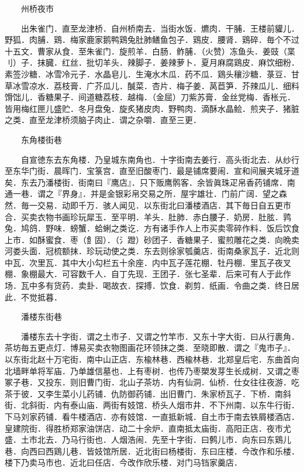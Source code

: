 　　州桥夜市

　　出朱雀门．直至龙津桥．自州桥南去．当街水饭．爊肉．干脯．王楼前貛儿．野狐．肉脯．鶏．梅家鹿家鹅鸭鶏兔肚肺鳝鱼包子．鶏皮．腰肾．鶏碎．毎个不过十五文．曹家从食．至朱雀门．旋煎羊．白肠．鲊脯．（火赞）冻鱼头．姜豉（枼刂）子．抹臓．红丝．批切羊头．辣脚子．姜辣萝卜．夏月麻腐鶏皮．麻饮细粉．素签沙糖．冰雪冷元子．水晶皂儿．生淹水木瓜．药不瓜．鶏头穰沙糖．菉豆．甘草冰雪凉水．荔枝膏．广芥瓜儿．醎菜．杏片．梅子姜．莴苣笋．芥辣瓜儿．细料馉饳儿．香糖果子．间道糖荔枝．越梅．（金屈）刀紫苏膏．金丝党梅．香枨元．皆用梅红匣儿盛贮．冬月盘兔．旋炙猪皮肉．野鸭肉．滴酥水晶鲙．煎夹子．猪脏之类．直至龙津桥须脑子肉止．谓之杂嚼．直至三更．

　　东角楼街巷

　　自宣徳东去东角楼．乃皇城东南角也．十字街南去姜行．高头街北去．从纱行至东华门街．晨晖门．宝箓宫．直至旧酸枣门．最是铺席要闹．宣和间展夹城牙道矣．东去乃潘楼街．街南曰『鹰店』．只下贩鹰鹘客．余皆眞珠疋帛香药铺席．南通一巷．谓之『界身』．并是金银彩帛交易之所．屋宇雄壮．门前广阔．望之森然．毎一交易．动即千万．骇人闻见．以东街北曰潘楼酒店．其下毎日自五更市合．买卖衣物书画珍玩犀玉．至平明．羊头．肚肺．赤白腰子．奶房．肚胘．鹑兔．鸠鸽．野味．螃蟹．蛤蜊之类讫．方有诸手作人上市买卖零碎作料．饭后饮食上市．如酥蜜食．枣（飠固）．（氵蹬）砂团子．香糖果子．蜜煎雕花之类．向晩卖河娄头面．冠梳额抹．珍玩动使之类．东去则徐家瓠羹店．街南桑家瓦子．近北则中瓦．次里瓦．其中大小勾栏五十余座．内中瓦子莲花棚．牡丹棚．里瓦子夜叉棚．象棚最大．可容数千人．自丁先现．王团子．张七圣辈．后来可有人于此作场．瓦中多有货药．卖卦．喝故衣．探搏．饮食．剃剪．纸画．令曲之类．终日居此．不觉抵暮．

　　潘楼东街巷

　　潘楼东去十字街．谓之土市子．又谓之竹竿市．又东十字大街．曰从行裹角．茶坊毎五更点灯．博易买卖衣物图画花环领抹之类．至晓即散．谓之『鬼市子』．以东街北赵十万宅街．南中山正店．东楡林巷．西楡林巷．北郑皇后宅．东曲首向北墙畔单将军庙．乃单雄信墓也．上有枣树．也传乃枣槊发芽生长成树．又谓之枣冢子巷．又投东．则旧曹门街．北山子茶坊．内有仙洞．仙桥．仕女往往夜游．吃茶于彼．又李生菜小儿药铺．仇防御药铺．出旧曹门．朱家桥瓦子．下桥．南斜街．北斜街．内有泰山庙．两街有妓馆．桥头人烟市井．不下州南．以东牛行街．下马刘家药铺．看牛楼酒店．亦有妓馆．一直抵新城．自土市于南去铁屑楼酒店．皇建院街．得胜桥郑家油饼店．动二十余炉．直南抵太庙街．高阳正店．夜市尤盛．土市北去．乃马行街也．人烟浩闹．先至十字街．曰鹩儿市．向东曰东鶏儿巷．向西曰西鶏儿巷．皆妓馆所居．近北街曰杨楼街．东曰庄楼．今改作和乐楼．楼下乃卖马市也．近北曰任店．今改作欣乐楼．对门马铛家羹店．

